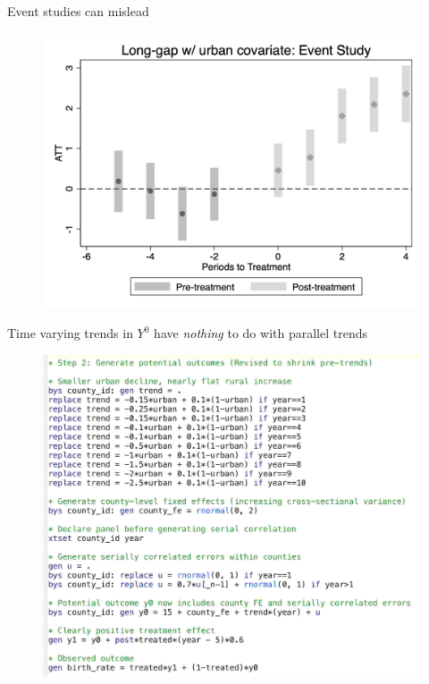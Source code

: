 \documentclass{beamer}
\begin{document}
\begin{frame}{Event studies can mislead}

\begin{figure}
    \centering
    \includegraphics[height=0.75\textheight]{./lecture_includes/es_correct.png}
\end{figure}

\end{frame}

\begin{frame}{Time varying trends in $Y^0$ have \emph{nothing} to do with parallel trends}

\begin{figure}
    \centering
    \includegraphics[height=0.75\textheight]{./lecture_includes/misleading_eventstudy_code.jpg}
\end{figure}

\end{frame}
\end{document}
